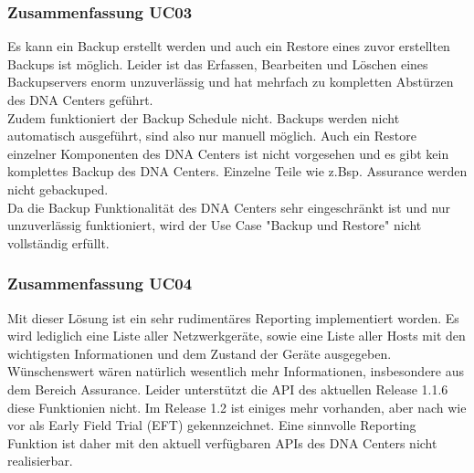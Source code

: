 \begin{landscape}
\subsubsection{Zusammenfassung UC03}
Es kann ein Backup erstellt werden und auch ein Restore eines zuvor erstellten Backups ist möglich. Leider ist das Erfassen, Bearbeiten und Löschen eines Backupservers enorm unzuverlässig und hat mehrfach zu kompletten Abstürzen des DNA Centers geführt. \\
Zudem funktioniert der Backup Schedule nicht. Backups werden nicht automatisch ausgeführt, sind also nur manuell möglich. Auch ein Restore einzelner Komponenten des DNA Centers ist nicht vorgesehen und es gibt kein komplettes Backup des DNA Centers. Einzelne Teile wie z.Bsp. Assurance werden nicht gebackuped. \\
Da die Backup Funktionalität des DNA Centers sehr eingeschränkt ist und nur unzuverlässig funktioniert, wird der Use Case "Backup und Restore" nicht vollständig erfüllt.
\pagebreak


\subsubsection{Zusammenfassung UC04}
Mit dieser Lösung ist ein sehr rudimentäres Reporting implementiert worden. Es wird lediglich eine Liste aller Netzwerkgeräte, sowie eine Liste aller Hosts mit den wichtigsten Informationen und dem Zustand der Geräte ausgegeben. Wünschenswert wären natürlich wesentlich mehr Informationen, insbesondere aus dem Bereich Assurance. Leider unterstützt die API des aktuellen Release 1.1.6 diese Funktionien nicht. Im Release 1.2 ist einiges mehr vorhanden, aber nach wie vor als Early Field Trial (EFT) gekennzeichnet. 
Eine sinnvolle Reporting Funktion ist daher mit den aktuell verfügbaren APIs des DNA Centers nicht realisierbar.



\end{landscape}
